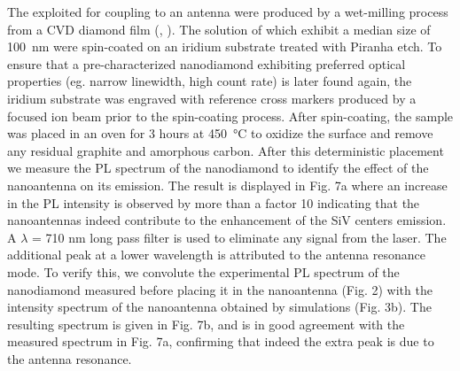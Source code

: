 			The \nds exploited for coupling to an antenna were produced by a wet-milling process from a CVD diamond film (\muzha, \williams).
			The solution of \nds which exhibit a median size of \SI{100}{nm} were spin-coated on an iridium substrate treated with Piranha etch. 
			To ensure that a pre-characterized nanodiamond exhibiting preferred optical properties (eg. narrow linewidth, high count rate) is later found again, the iridium substrate was engraved with reference cross markers produced by a focused ion beam prior to the spin-coating process.
			After spin-coating, the sample was placed in an oven for 3 hours at \SI{450}{\celsius} to oxidize the surface and remove any residual graphite and amorphous carbon. 
			After this deterministic placement we measure the PL spectrum of the nanodiamond to identify the effect of the nanoantenna on its emission. The result is displayed in Fig. 7a where an increase in the PL intensity is observed by more than a factor 10 indicating that the nanoantennas indeed contribute to the enhancement of the SiV centers emission. A $\lambda$ = 710 nm long pass filter is used to eliminate any signal from the laser. The additional peak at a lower wavelength is attributed to the antenna resonance mode. To verify this, we convolute the experimental PL spectrum of the nanodiamond measured before placing it in the nanoantenna (Fig. 2) with the intensity spectrum of the nanoantenna obtained by simulations (Fig. 3b). The resulting spectrum is given in Fig. 7b, and is in good agreement with the measured spectrum in Fig. 7a, confirming that indeed the extra peak is due to the antenna resonance.

